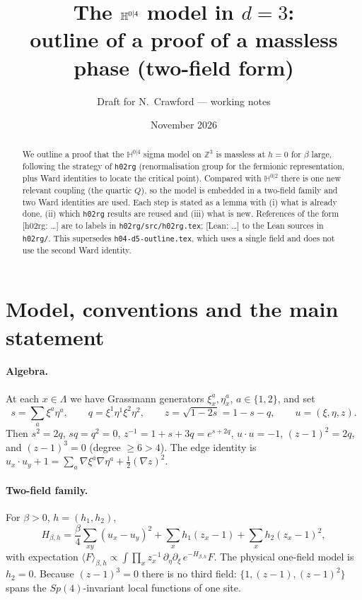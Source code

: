 \documentclass[11pt]{article}
\title{The $\HH^{0|4}$ model in $d=3$:\\ outline of a proof of a massless phase (two-field form)}
\author{Draft for N.~Crawford --- working notes}
\date{November 2026}
\theoremstyle{definition}
\theoremstyle{remark}
\newcommand{\HH}{\mathbb{H}}
\newcommand{\avg}[1]{\langle #1\rangle}
\newcommand{\reuse}[1]{\textsf{[h02rg: #1]}}
\newcommand{\lean}[1]{\textsf{[Lean: #1]}}
\begin{document}
\maketitle

\begin{abstract}
  We outline a proof that the $\HH^{0|4}$ sigma model on $\mathbb{Z}^3$ is massless at
  $h=0$ for $\beta$ large, following the strategy of \texttt{h02rg} (renormalisation group
  for the fermionic representation, plus Ward identities to locate the critical point).
  Compared with $\HH^{0|2}$ there is one new relevant coupling (the quartic $Q$), so the
  model is embedded in a two-field family and two Ward identities are used. Each step is
  stated as a lemma with (i) what is already done, (ii) which \texttt{h02rg} results are
  reused and (iii) what is new. References of the form \reuse{\dots} are to labels in
  \texttt{h02rg/src/h02rg.tex}; \lean{\dots} to the Lean sources in \texttt{h02rg/}.
  This supersedes \texttt{h04-d5-outline.tex}, which uses a single field and does not
  use the second Ward identity.
\end{abstract}

\tableofcontents

\section{Model, conventions and the main statement}

\paragraph{Algebra.} At each $x\in\Lambda$ we have Grassmann generators $\xi^a_x,\eta^a_x$,
$a\in\{1,2\}$, and set
\[
  s=\sum_a\xi^a\eta^a,\qquad q=\xi^1\eta^1\xi^2\eta^2,\qquad z=\sqrt{1-2s}=1-s-q,\qquad
  u=(\xi,\eta,z).
\]
Then $s^2=2q$, $sq=q^2=0$, $z^{-1}=1+s+3q=e^{s+2q}$, $u\cdot u=-1$, $(z-1)^2=2q$, and
$(z-1)^3=0$ (degree $\ge 6>4$). The edge identity is
$u_x\cdot u_y+1=\sum_a\nabla\xi^a\nabla\eta^a+\tfrac12(\nabla z)^2$.

\paragraph{Two-field family.} For $\beta>0$, $h=(h_1,h_2)$,
\begin{equation}\label{e:H}
  H_{\beta,h}=\frac{\beta}{4}\sum_{xy}(u_x-u_y)^2+\sum_x h_1(z_x-1)+\sum_x h_2(z_x-1)^2,
\end{equation}
with expectation $\avg{F}_{\beta,h}\propto\int\prod_x z_x^{-1}\,\partial_\eta\partial_\xi\,
e^{-H_{\beta,h}}F$. The physical one-field model is $h_2=0$. Because $(z-1)^3=0$ there is
no third field: $\{1,(z-1),(z-1)^2\}$ spans the $Sp(4)$-invariant local functions of one site.
\end{document}
